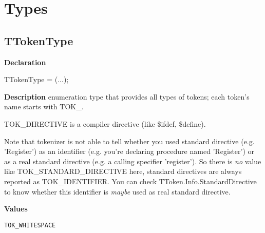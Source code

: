 \documentclass{report}
\newif\ifpdf
\begin{document}
\section{Types}
\ifpdf
\subsection*{\large{\textbf{TTokenType}}\normalsize\hspace{1ex}\hrulefill}
\else
\subsection*{TTokenType}
\fi
\label{PasDoc_Tokenizer-TTokenType}
\begin{list}{}{
\setlength{\itemindent}{0cm}
\setlength{\listparindent}{0cm}
\setlength{\leftmargin}{\evensidemargin}
\addtolength{\leftmargin}{\tmplength}
\settowidth{\labelsep}{X}
\addtolength{\leftmargin}{\labelsep}
\setlength{\labelwidth}{\tmplength}
}
\item[\textbf{Declaration}\hfill]
\ifpdf
\begin{flushleft}
\fi
\begin{ttfamily}
TTokenType = (...);\end{ttfamily}

\ifpdf
\end{flushleft}
\fi

\par
\item[\textbf{Description}]
enumeration type that provides all types of tokens; each token's name starts with TOK{\_}.

TOK{\_}DIRECTIVE is a compiler directive (like {\$}ifdef, {\$}define).

Note that tokenizer is not able to tell whether you used standard directive (e.g. 'Register') as an identifier (e.g. you're declaring procedure named 'Register') or as a real standard directive (e.g. a calling specifier 'register'). So there is \textit{no} value like TOK{\_}STANDARD{\_}DIRECTIVE here, standard directives are always reported as TOK{\_}IDENTIFIER. You can check TToken.Info.StandardDirective to know whether this identifier is \textit{maybe} used as real standard directive.\item[\textbf{Values}]
\begin{description}
\item[\texttt{TOK{\_}WHITESPACE}] \label{PasDoc_Tokenizer-TOK_WHITESPACE}
\index{}
 

\end{description}
\end{list}
\end{document}
